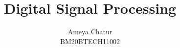 \documentclass[journal,12pt,twocolumn]{IEEEtran}
\begin{document}
     \def\rightbox#1{\makebox[0in][r]{#1}}
     \def\centbox#1{\makebox[0in]{#1}}
     \def\topbox#1{\raisebox{-\baselineskip}[0in][0in]{#1}}
     \def\midbox#1{\raisebox{-0.5\baselineskip}[0in][0in]{#1}}
\vspace{3cm}
\title{ 
Digital Signal Processing 
}
%
%
%
\author{ Ameya Chatur \\BM20BTECH11002%
}
% 
%
\end{document}
